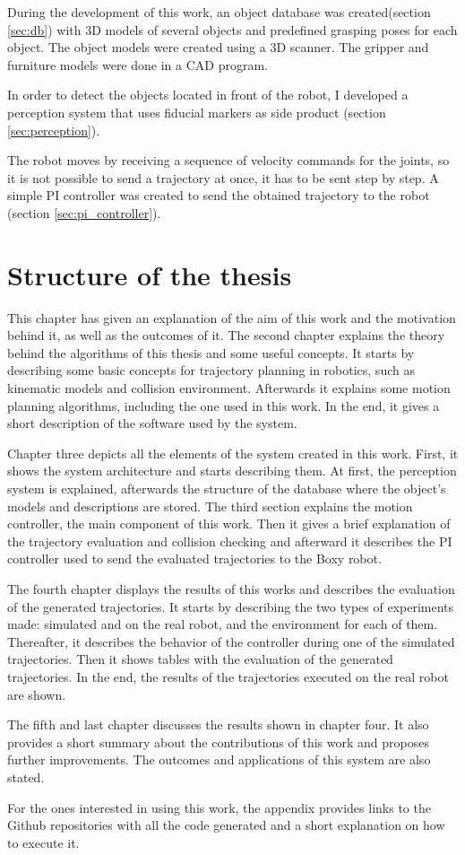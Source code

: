 During the development of this work, an object database was created(section \ref{sec:db}) with 3D models of several objects and predefined grasping poses for each object. The object models were created using a 3D scanner. The gripper and furniture models were done in a CAD program.

In order to detect the objects located in front of the robot, I developed a perception system that uses fiducial markers as side product (section \ref{sec:perception}).

The robot moves by receiving a sequence of velocity commands for the joints, so it is not possible to send a trajectory at once, it has to be sent step by step. A simple PI controller was created to send the obtained trajectory to the robot (section \ref{sec:pi_controller}).


\section{Structure of the thesis}

This chapter has given an explanation of the aim of this work and the motivation behind it, as well as the outcomes of it. The second chapter explains the theory behind the algorithms of this thesis and some useful concepts. It starts by describing some basic concepts for trajectory planning in robotics, such as kinematic models and collision environment. Afterwards it explains some motion planning algorithms, including the one used in this work. In the end, it gives a short description of the  software used by the system.

Chapter three depicts all the elements of the system created in this work. First, it shows the system architecture and starts describing them. At first, the perception system is explained, afterwards the structure of the database where the object's models and descriptions are stored. The third section explains the motion controller, the main component of this work. Then it gives a brief explanation of the trajectory evaluation and collision checking and afterward it describes the PI controller used to send the evaluated trajectories to the Boxy robot.

The fourth chapter displays the results of this works and describes the evaluation of the generated trajectories. It starts by describing the two types of experiments made: simulated and on the real robot, and the environment for each of them. Thereafter, it describes the behavior of the controller during one of the simulated trajectories. Then it shows tables with the evaluation of the generated trajectories. In the end, the results of the trajectories executed on the real robot are shown.

The fifth and last chapter discusses the results shown in chapter four. It also provides a short summary about the contributions of this work and proposes further improvements. The outcomes and applications of this system are also stated.

For the ones interested in using this work, the appendix provides links to the Github repositories with all the code generated and a short explanation on how to execute it.
